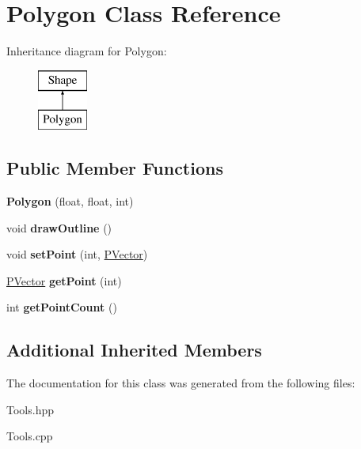 \hypertarget{class_polygon}{}\section{Polygon Class Reference}
\label{class_polygon}
Inheritance diagram for Polygon\+:\begin{figure}[H]
\begin{center}
\leavevmode
\includegraphics[height=2.000000cm]{class_polygon}
\end{center}
\end{figure}
\subsection*{Public Member Functions}
\begin{DoxyCompactItemize}
\item 
\hypertarget{class_polygon_a8ba4cc1def2c799bb4e75df1aa6fbb72}{}\label{class_polygon_a8ba4cc1def2c799bb4e75df1aa6fbb72} 
{\bfseries Polygon} (float, float, int)
\item 
\hypertarget{class_polygon_a3ae4366cd72f2414f133fab680983ea9}{}\label{class_polygon_a3ae4366cd72f2414f133fab680983ea9} 
void {\bfseries draw\+Outline} ()
\item 
\hypertarget{class_polygon_a55580fc352e83e29d3bc2679e5d8bdbf}{}\label{class_polygon_a55580fc352e83e29d3bc2679e5d8bdbf} 
void {\bfseries set\+Point} (int, \hyperlink{struct_p_vector}{P\+Vector})
\item 
\hypertarget{class_polygon_a5423331a39f62cf1382b9465bfa170aa}{}\label{class_polygon_a5423331a39f62cf1382b9465bfa170aa} 
\hyperlink{struct_p_vector}{P\+Vector} {\bfseries get\+Point} (int)
\item 
\hypertarget{class_polygon_ad269b9c3f239834cd24235c73dd31bab}{}\label{class_polygon_ad269b9c3f239834cd24235c73dd31bab} 
int {\bfseries get\+Point\+Count} ()
\end{DoxyCompactItemize}
\subsection*{Additional Inherited Members}


The documentation for this class was generated from the following files\+:\begin{DoxyCompactItemize}
\item 
Tools.\+hpp\item 
Tools.\+cpp\end{DoxyCompactItemize}
